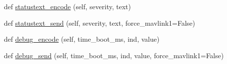 \begin{DoxyCompactItemize}
\item 
def \hyperlink{classpymavlink_1_1dialects_1_1v10_1_1MAVLink_abd31da74dc9d7e840ea09b36ab321a88}{statustext\+\_\+encode} (self, severity, text)
\item 
def \hyperlink{classpymavlink_1_1dialects_1_1v10_1_1MAVLink_abf7cae7535132ba8417fcfbbea639461}{statustext\+\_\+send} (self, severity, text, force\+\_\+mavlink1=False)
\item 
def \hyperlink{classpymavlink_1_1dialects_1_1v10_1_1MAVLink_a1ba6cb28e19c757bde356e136f155de1}{debug\+\_\+encode} (self, time\+\_\+boot\+\_\+ms, ind, value)
\item 
def \hyperlink{classpymavlink_1_1dialects_1_1v10_1_1MAVLink_a8c49b6c3568c9d1a4e74b540f2612ff8}{debug\+\_\+send} (self, time\+\_\+boot\+\_\+ms, ind, value, force\+\_\+mavlink1=False)
\end{DoxyCompactItemize}

